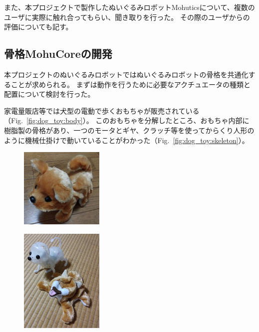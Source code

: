 \documentclass[uplatex,a4paper,12pt]{jsarticle}
\renewcommand{\figurename}{Fig.}
\newcommand{\figref}[1]{\figurename~\ref{#1}}
\begin{document}
また、本プロジェクトで製作したぬいぐるみロボットMohuticsについて、複数のユーザに実際に触れ合ってもらい、聞き取りを行った。
その際のユーザからの評価についても記す。

\subsection{骨格MohuCoreの開発}
本プロジェクトのぬいぐるみロボットではぬいぐるみロボットの骨格を共通化することが求められる。
まずは動作を行うために必要なアクチュエータの種類と配置について検討を行った。

家電量販店等では犬型の電動で歩くおもちゃが販売されている（\figref{fig:dog_toy:body}）。
このおもちゃを分解したところ、おもちゃ内部に樹脂製の骨格があり、一つのモータとギヤ、クラッチ等を使ってからくり人形のように機械仕掛けで動いていることがわかった（\figref{fig:dog_toy:skeleton}）。
\begin{figure}[htbp]
  \centering
  \begin{minipage}[c]{0.48\linewidth}
    \centering
    \includegraphics[keepaspectratio,width=4cm,clip]{images/dog_toy/dog.jpg}
    \label{fig:dog_toy:body}
  \end{minipage}
  \begin{minipage}[c]{0.48\linewidth}
    \centering
    \includegraphics[keepaspectratio,width=4cm,clip]{images/dog_toy/skeleton.jpg}
    \label{fig:dog_toy:skeleton}
  \end{minipage}
  \label{fig:dog_toy}
\end{figure}
\end{document}
